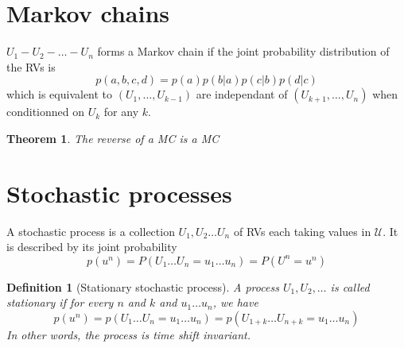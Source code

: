 \documentclass{article}
\newtheorem{theorem}{Theorem}[section]
\newtheorem{definition}{Definition}[section]
\theoremstyle{definition} %
\def\U{\mathcal{U}}
\begin{document}
\newpage
\begin{appendices}
\section{Markov chains}
\label{appendix:markov-chains}

$U_1 - U_2 - \dots - U_n$ forms a Markov chain if the joint probability
distribution of the RVs is
\[
  p(a,b,c,d) = p(a)p(b|a)p(c|b)p(d|c)
\]
which is equivalent to $(U_1, \dots, U_{k-1})$ are independant of $(U_{k+1}, \dots, U_n)$ when conditionned on $U_k$ for any $k$.


\begin{theorem}
  The reverse of a MC is a MC
\end{theorem}


\section{Stochastic processes}
\label{appendix:stoch-proc}

A stochastic process is a collection $U_1, U_2 \dots U_n$ of RVs each taking values in $\U$. It is described by its joint probability
\[
  p(u^n) = P(U_1 \dots U_n = u_1 \dots u_n) = P(U^n = u^n)
\]

\begin{definition}[Stationary stochastic process]
  A process $U_1, U_2, \dots$ is called stationary if for every $n$ and $k$ and $u_1 \dots u_n$, we have
  \[
    p(u^n) = p(U_1 \dots U_n = u_1 \dots u_n) = p(U_{1+k} \dots U_{n+k} = u_1 \dots u_n)
  \]
  In other words, the process is time shift invariant.
\end{definition}

\end{appendices}
\end{document}
